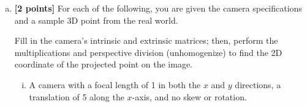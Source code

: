\begin{enumerate}[(a)]
\item \textbf{[2 points]}
For each of the following, you are given the camera specifications and a sample 3D point from the real world. 

\begin{tcolorbox}[colback=orange!5!white,colframe=orange!75!black]
Fill in the camera's intrinsic and extrinsic matrices; then, perform the multiplications and perspective division (unhomogenize) to find the 2D coordinate of the projected point on the image.
\end{tcolorbox}

\begin{enumerate} [(i)]
\item A camera with a focal length of 1 in both the $x$ and $y$ directions, a translation of 5 along the $x$-axis, and no skew or rotation.


\end{enumerate}
\end{enumerate}
